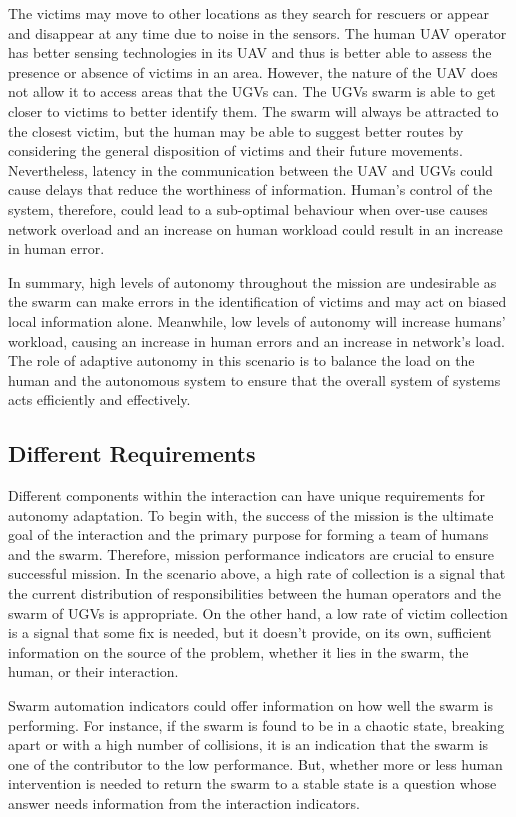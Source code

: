 \documentclass[journal]{IEEEtran}
\begin{document}
The victims may move to other locations as they search for rescuers or appear and disappear at any time due to noise in the sensors. The human UAV operator has better sensing technologies in its UAV and thus is better able to assess the presence or absence of victims in an area. However, the nature of the UAV does not allow it to access areas that the UGVs can. The UGVs swarm is able to get closer to victims to better identify them. The swarm will always be attracted to the closest victim, but the human may be able to suggest better routes by considering the general disposition of victims and their future movements. Nevertheless, latency in the communication between the UAV and UGVs could cause delays that reduce the worthiness of information. Human's control of the system, therefore, could lead to a sub-optimal behaviour when over-use causes network overload and an increase on human workload could result in an increase in human error. 

In summary, high levels of autonomy throughout the mission are undesirable as the swarm can make errors in the identification of victims and may act on biased local information alone. Meanwhile, low levels of autonomy will increase humans' workload, causing an increase in human errors and an increase in network's load. The role of adaptive autonomy in this scenario is to balance the load on the human and the autonomous system to ensure that the overall system of systems acts efficiently and effectively.

\subsection{Different Requirements}
Different components within the interaction can have unique requirements for autonomy adaptation. To begin with, the success of the mission is the ultimate goal of the interaction and the primary purpose for forming a team of humans and the swarm. Therefore, mission performance indicators are crucial to ensure successful mission. In the scenario above, a high rate of collection is a signal that the current distribution of responsibilities between the human operators and the swarm of UGVs is appropriate. On the other hand, a low rate of victim collection is a signal that some fix is needed, but it doesn\textquoteright t provide, on its own, sufficient information on the source of the problem, whether it lies in the swarm, the human, or their interaction.

Swarm automation indicators could offer information on how well the swarm is performing. For instance, if the swarm is found to be in a chaotic state, breaking apart or with a high number of collisions, it is an indication that the swarm is one of the contributor to the low performance. But, whether more or less human intervention is needed to return the swarm to a stable state is a question whose answer needs information from the interaction indicators. 
\end{document}
